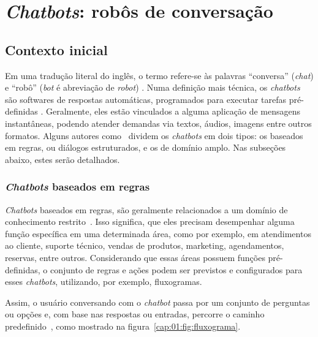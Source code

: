 \chapter{\textit{Chatbots}: robôs de conversação}\label{cap:02:referencial}


\section{Contexto inicial}\label{cap:02:sec:01:contexto}

Em uma tradução literal do inglês, o termo refere-se às palavras “conversa” (\textit{chat}) e “robô” (\textit{bot} é abreviação de \textit{robot}) \cite{SimplyChat}.
Numa definição mais técnica, os \textit{chatbots} são softwares de respostas automáticas, programados para executar tarefas pré-definidas \cite{GamaMedeiros}.
Geralmente, eles estão vinculados a alguma aplicação de mensagens instantâneas, podendo atender demandas via textos, áudios, imagens entre outros formatos.
Alguns autores como~ dividem os \textit{chatbots} em dois tipos: os baseados em regras, ou diálogos estruturados, e os de domínio amplo. Nas subseções abaixo, estes serão detalhados.


\subsection{\textit{Chatbots} baseados em regras}\label{cap:02:sec:01:sub:01:bot-regras}

\textit{Chatbots} baseados em regras, são geralmente relacionados a um domínio de conhecimento restrito~\cite{Juliano}.
Isso significa, que eles precisam desempenhar alguma função específica em uma determinada área, como por exemplo, em atendimentos ao cliente, suporte técnico, vendas de produtos, marketing, agendamentos, reservas, entre outros.
Considerando que essas áreas possuem funções pré-definidas, o conjunto de regras e ações podem ser previstos e configurados para esses \textit{chatbots}, utilizando, por exemplo, fluxogramas.

Assim, o usuário conversando com o \textit{chatbot} passa por um conjunto de perguntas ou opções e, com base nas respostas ou entradas, percorre o caminho predefinido~\cite{Samer}, como mostrado na figura~\ref{cap:01:fig:fluxograma}.

